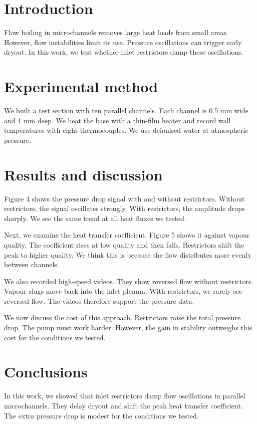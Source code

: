 \documentclass{article}
\begin{document}
\section{Introduction}
Flow boiling in microchannels removes large heat loads from small areas. However, flow instabilities limit its use. Pressure oscillations can trigger early dryout. In this work, we test whether inlet restrictors damp these oscillations.

\section{Experimental method}
We built a test section with ten parallel channels. Each channel is 0.5 mm wide and 1 mm deep. We heat the base with a thin-film heater and record wall temperatures with eight thermocouples. We use deionised water at atmospheric pressure.

\section{Results and discussion}
Figure 4 shows the pressure drop signal with and without restrictors. Without restrictors, the signal oscillates strongly. With restrictors, the amplitude drops sharply. We see the same trend at all heat fluxes we tested.

Next, we examine the heat transfer coefficient. Figure 5 shows it against vapour quality. The coefficient rises at low quality and then falls. Restrictors shift the peak to higher quality. We think this is because the flow distributes more evenly between channels.

We also recorded high-speed videos. They show reversed flow without restrictors. Vapour slugs move back into the inlet plenum. With restrictors, we rarely see reversed flow. The videos therefore support the pressure data.

We now discuss the cost of this approach. Restrictors raise the total pressure drop. The pump must work harder. However, the gain in stability outweighs this cost for the conditions we tested.

\section{Conclusions}
In this work, we showed that inlet restrictors damp flow oscillations in parallel microchannels. They delay dryout and shift the peak heat transfer coefficient. The extra pressure drop is modest for the conditions we tested.
\end{document}
